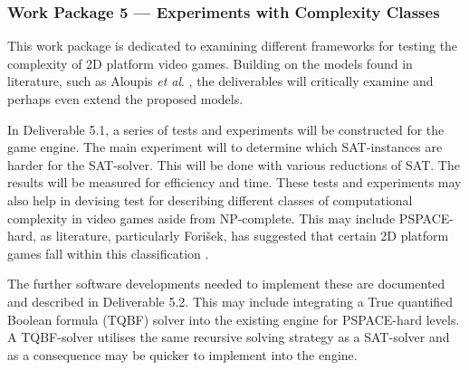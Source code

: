 \documentclass[a4paper]{article}
\begin{document}






\subsubsection{Work Package 5 --- Experiments with Complexity Classes}

This work package is dedicated to examining different frameworks for testing the complexity of 2D
platform video games. Building on the models found in literature, such as Aloupis \textit{et al}.
\cite{Aloupis2012}, the deliverables will critically examine and perhaps even extend the proposed
models.

In Deliverable 5.1, a series of tests and experiments will be constructed for the game engine. The
main experiment will to determine which SAT-instances are harder for the SAT-solver. This will be
done with various reductions of SAT. The results will be measured for efficiency and time. These
tests and experiments may also help in devising test for describing different classes of
computational complexity in video games aside from NP-complete. This may include PSPACE-hard, as
literature, particularly Fori\v{s}ek, has suggested that certain 2D platform games fall within this
classification \@\cite{DBLP:conf/fun/Forisek10}.

The further software developments needed to implement these are documented and described in
Deliverable 5.2. This may include integrating a True quantified Boolean formula (TQBF) solver into
the existing engine for PSPACE-hard levels. A TQBF-solver utilises the same recursive solving
strategy as a SAT-solver and as a consequence may be quicker to implement into the engine.
\end{document}
